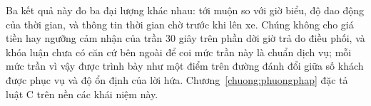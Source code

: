 Ba kết quả này đo ba đại lượng khác nhau: tới muộn so với giờ biểu, độ dao động của thời gian, và thông tin thời gian
chờ trước khi lên xe. Chúng không cho giá tiền hay ngưỡng cảm nhận của trần 30 giây trên phần dời giờ trả do điều
phối, và khóa luận chưa có căn cứ bên ngoài để coi mức trần này là chuẩn dịch vụ; mỗi mức trần vì vậy được trình bày
như một điểm trên đường đánh đổi giữa số khách được phục vụ và độ ổn định của lời hứa.
Chương~\ref{chuong:phuongphap} đặc tả luật C trên nền các khái niệm này.
